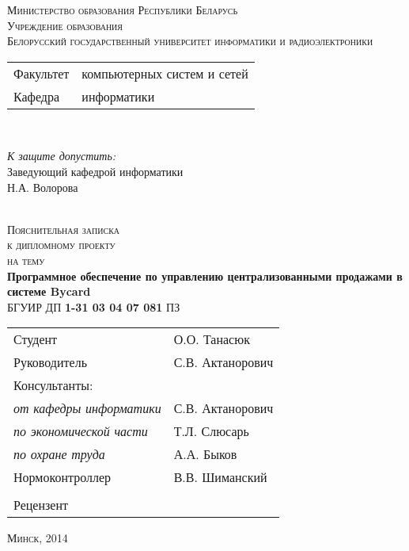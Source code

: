 \begin{titlepage}
  \begin{center}
    \textsc{\small Министерство образования Республики Беларусь}\\[0.5cm]
    \textsc{\small Учреждение образования\\\large Белорусский государственный университет информатики и радиоэлектроники}\\[0.5cm]
    \begin{minipage}{\textwidth}
      \begin{flushleft}
        \begin{tabular}{ l l }
          Факультет & компьютерных систем и сетей\\
          Кафедра   & информатики
        \end{tabular}
      \end{flushleft}
    \end{minipage}\\[0.5cm]
    \begin{minipage}{\textwidth}
      \begin{flushright}
        \textit{К защите допустить:}\\
        Заведующий кафедрой информатики\\
        \underline{\hspace*{4.5cm}} Н.А. Волорова
      \end{flushright}
    \end{minipage}\\[1.5cm]
    \textsc{\large Пояснительная записка}\\
    \textsc{\small к дипломному проекту}\\
    \textsc{\small на тему}\\[0.5cm]
    \textbf{\large Программное обеспечение по управлению централизованными продажами в системе Bycard}\\[0.5cm]
    {\small БГУИР ДП \textbf{1-31 03 04 07 081} ПЗ}\\[0.5cm]
    {\small
      \begin{tabular}{ l l }
        Студент \hspace*{10cm} & О.О. Танасюк\\
        Руководитель & С.В. Актанорович\\
        Консультанты: &\\
        \hspace*{0.5cm}\emph{от кафедры информатики} & С.В. Актанорович\\
        \hspace*{0.5cm}\emph{по экономической части} & Т.Л. Слюсарь\\
        \hspace*{0.5cm}\emph{по охране труда} & А.А. Быков\\
        Нормоконтроллер & В.В. Шиманский\\
        &\\
        Рецензент &
      \end{tabular}
    }
    \vfill
    \textsc{\small Минск, 2014}
  \end{center}
\end{titlepage}
